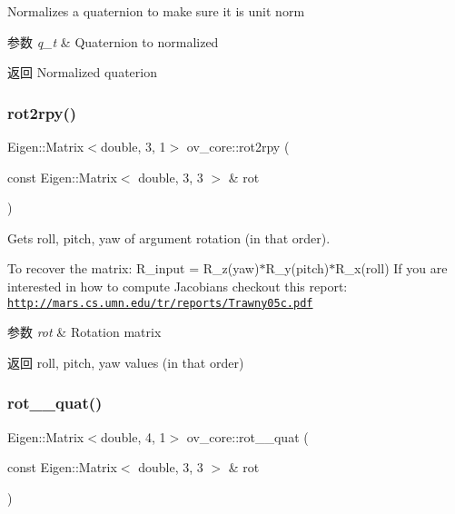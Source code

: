Normalizes a quaternion to make sure it is unit norm 


\begin{DoxyParams}{参数}
{\em q\+\_\+t} & Quaternion to normalized \\
\hline
\end{DoxyParams}
\begin{DoxyReturn}{返回}
Normalized quaterion 
\end{DoxyReturn}
\mbox{\label{namespaceov__core_af608ab8e3f8cd8554ade192cd804b7ce}} 
\subsubsection{\texorpdfstring{rot2rpy()}{rot2rpy()}}
{\footnotesize\ttfamily Eigen\+::\+Matrix$<$double, 3, 1$>$ ov\+\_\+core\+::rot2rpy (\begin{DoxyParamCaption}\item[{const Eigen\+::\+Matrix$<$ double, 3, 3 $>$ \&}]{rot }\end{DoxyParamCaption})\hspace{0.3cm}{\ttfamily [inline]}}



Gets roll, pitch, yaw of argument rotation (in that order). 

To recover the matrix\+: R\+\_\+input = R\+\_\+z(yaw)$\ast$\+R\+\_\+y(pitch)$\ast$\+R\+\_\+x(roll) If you are interested in how to compute Jacobians checkout this report\+: \href{http://mars.cs.umn.edu/tr/reports/Trawny05c.pdf}{\tt http\+://mars.\+cs.\+umn.\+edu/tr/reports/\+Trawny05c.\+pdf}


\begin{DoxyParams}{参数}
{\em rot} & Rotation matrix \\
\hline
\end{DoxyParams}
\begin{DoxyReturn}{返回}
roll, pitch, yaw values (in that order) 
\end{DoxyReturn}
\mbox{\label{namespaceov__core_a1d2aafa6a756bb70fcd9f52695b4e573}} 
\subsubsection{\texorpdfstring{rot\+\_\+\_\+quat()}{rot\_2\_quat()}}
{\footnotesize\ttfamily Eigen\+::\+Matrix$<$double, 4, 1$>$ ov\+\_\+core\+::rot\+\_\+\_\+quat (\begin{DoxyParamCaption}\item[{const Eigen\+::\+Matrix$<$ double, 3, 3 $>$ \&}]{rot }\end{DoxyParamCaption})\hspace{0.3cm}{\ttfamily [inline]}}




